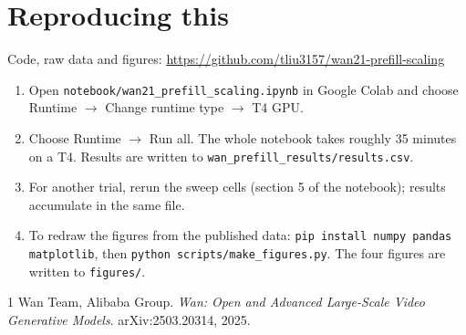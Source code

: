 \documentclass[11pt]{article}
\begin{document}
\section{Reproducing this}

Code, raw data and figures: \url{https://github.com/tliu3157/wan21-prefill-scaling}

\begin{enumerate}
\item Open \texttt{notebook/wan21\_prefill\_scaling.ipynb} in Google Colab and choose Runtime $\rightarrow$ Change runtime type $\rightarrow$ T4 GPU.
\item Choose Runtime $\rightarrow$ Run all. The whole notebook takes roughly 35 minutes on a T4. Results are written to \texttt{wan\_prefill\_results/results.csv}.
\item For another trial, rerun the sweep cells (section 5 of the notebook); results accumulate in the same file.
\item To redraw the figures from the published data: \texttt{pip install numpy pandas matplotlib}, then \texttt{python scripts/make\_figures.py}. The four figures are written to \texttt{figures/}.
\end{enumerate}

\begin{thebibliography}{1}
 Wan Team, Alibaba Group. \emph{Wan: Open and Advanced Large-Scale Video Generative Models}. arXiv:2503.20314, 2025.
\end{thebibliography}
\end{document}
